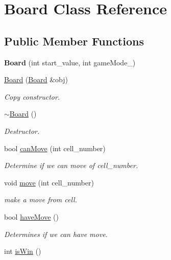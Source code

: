 \hypertarget{class_board}{}\section{Board Class Reference}
\label{class_board}
\subsection*{Public Member Functions}
\begin{DoxyCompactItemize}
\item 
{\bfseries Board} (int start\+\_\+value, int game\+Mode\+\_\+)\hypertarget{class_board_a7af281298a739de852e78d0f576743ab}{}\label{class_board_a7af281298a739de852e78d0f576743ab}

\item 
\hyperlink{class_board_a186bacc10feaee390bcc7950371e1cc1}{Board} (\hyperlink{class_board}{Board} \&obj)
\begin{DoxyCompactList}\small\item\em Copy constructor. \end{DoxyCompactList}\item 
\hyperlink{class_board_af73f45730119a1fd8f6670f53f959e68}{$\sim$\+Board} ()
\begin{DoxyCompactList}\small\item\em Destructor. \end{DoxyCompactList}\item 
bool \hyperlink{class_board_a86a64ec0fe585404e298fab4502a48ef}{can\+Move} (int cell\+\_\+number)
\begin{DoxyCompactList}\small\item\em Determine if we can move of cell\+\_\+number. \end{DoxyCompactList}\item 
void \hyperlink{class_board_a21ecc642f1351257c69f2d5c8e640deb}{move} (int cell\+\_\+number)
\begin{DoxyCompactList}\small\item\em make a move from cell. \end{DoxyCompactList}\item 
bool \hyperlink{class_board_a5096df29ad75d9e6be2373e69412d38d}{have\+Move} ()
\begin{DoxyCompactList}\small\item\em Determines if we can have move. \end{DoxyCompactList}\item 
int \hyperlink{class_board_a3ff621f3410f5d8011af0c68303f0841}{is\+Win} ()

\end{DoxyCompactItemize}
